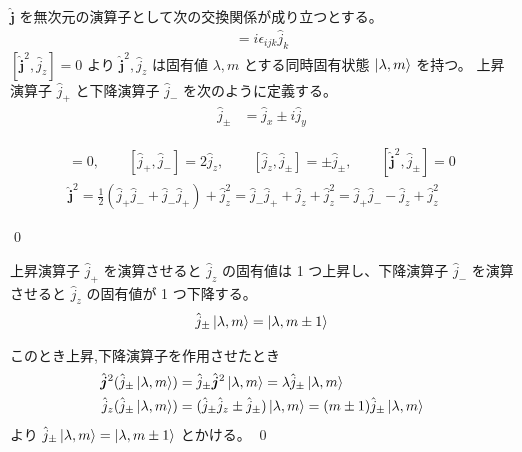 \documentclass[uplatex,dvipdfmx,a4paper,11pt]{jlreq}
\makeatletter
\theoremstyle{definition}
\renewenvironment{proof}[1][\proofname]{\par
  \normalfont
  \topsep6\p@\@plus6\p@ \trivlist
  \item[\hskip\labelsep{\bfseries #1}\@addpunct{\bfseries}]\ignorespaces\quad\par
}{%
  \qed\endtrivlist\@endpefalse
}
\renewcommand\proofname{証明}
\makeatother
\begin{document}
\begin{definition}
  $\hat{\bm{j}}$ を無次元の演算子として次の交換関係が成り立つとする。
  \begin{align}
    [\hat{j}_i, \hat{j}_j] = i\epsilon_{ijk}\hat{j}_k
  \end{align}
  $[\hat{\bm{j}}^2, \hat{j}_z] = 0$ より $\hat{\bm{j}}^2, \hat{j}_z$ は固有値 $\lambda, m$ とする同時固有状態 $\ket{\lambda, m}$ を持つ。
  上昇演算子 $\hat{j}_+$ と下降演算子 $\hat{j}_-$ を次のように定義する。
  \begin{align}
    \hat{j}_\pm & = \hat{j}_x \pm i\hat{j}_y
  \end{align}
\end{definition}

\begin{proposition}
  \begin{align}
    [\hat{\bm{j}}^2, \hat{j}_z] = 0, \qquad [\hat{j}_+, \hat{j}_-] = 2\hat{j}_z, \qquad [\hat{j}_z, \hat{j}_\pm] = \pm \hat{j}_\pm, \qquad [\hat{\bm{j}}^2, \hat{j}_\pm] = 0 \\
    \hat{\bm{j}}^2 = \frac{1}{2}(\hat{j}_+\hat{j}_- + \hat{j}_-\hat{j}_+) + \hat{j}_z^2 = \hat{j}_-\hat{j}_+ + \hat{j}_z + \hat{j}_z^2 = \hat{j}_+\hat{j}_- - \hat{j}_z + \hat{j}_z^2
  \end{align}
\end{proposition}
\begin{proof}
\end{proof}

\begin{proposition}
  上昇演算子 $\hat{j}_+$ を演算させると $\hat{j}_z$ の固有値は 1 つ上昇し、下降演算子 $\hat{j}_-$ を演算させると $\hat{j}_z$ の固有値が 1 つ下降する。
  \begin{align}
    \hat{j}_\pm\ket{\lambda, m} = \ket{\lambda, m\pm 1}
  \end{align}
\end{proposition}
\begin{proof}
  このとき上昇,下降演算子を作用させたとき
  \begin{align}
    \hat{\bm{j}}^2(\hat{j}_\pm\ket{\lambda, m}) & = \hat{j}_\pm\hat{\bm{j}}^2\ket{\lambda, m} = \lambda \hat{j}_\pm\ket{\lambda, m}               \\
    \hat{j}_z(\hat{j}_\pm\ket{\lambda, m})      & = (\hat{j}_\pm \hat{j}_z \pm \hat{j}_\pm)\ket{\lambda, m} = (m\pm 1)\hat{j}_\pm\ket{\lambda, m}
  \end{align}
  より $\hat{j}_\pm\ket{\lambda, m} = \ket{\lambda, m\pm 1}$ とかける。
\end{proof}
\end{document}
